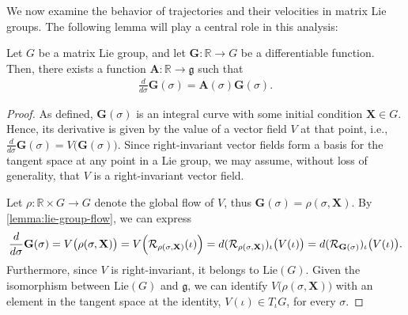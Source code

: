 We now examine the behavior of trajectories and their velocities in matrix Lie groups. The following lemma will play a central role in this analysis:
\begin{lemma} \label{lemma:derivative-lie-element-H-parallelizable} Let $G$ be a matrix Lie group, and let $\mathbf{G}:\mathbb{R}\to G$ be a differentiable function. Then, there exists a function $\mathbf{A}:\mathbb{R} \to \mathfrak{g}$ such that 
\begin{align}
    \frac{d}{d\sigma} \mathbf{G}(\sigma) = \mathbf{A}(\sigma) \mathbf{G}(\sigma). \label{eq:derivative-lie-element-H-parallelizable}
\end{align}
\end{lemma}
\begin{proof}
    As defined, $\mathbf{G}(\sigma)$ is an integral curve with some initial condition $\mathbf{X}\in G$. Hence, its derivative is given by the value of a vector field $V$ at that point, i.e., $\frac{d}{d\sigma}\mathbf{G}(\sigma) = V\bigl(\mathbf{G}(\sigma)\bigr)$. Since right-invariant vector fields form a basis for the tangent space at any point in a Lie group, we may assume, without loss of generality, that $V$ is a right-invariant vector field.

    Let $\rho: \mathbb{R} \times G \to G$ denote the global flow of $V$, thus $\mathbf{G}(\sigma) = \rho(\sigma, \mathbf{X})$. By \cref{lemma:lie-group-flow}, we can express
    \begin{align}
        \frac{d}{d\sigma} \mathbf{G}(\sigma) = V\bigl(\rho(\sigma, \mathbf{X})\bigr) = V\Bigl(\mathcal{R}_{\rho(\sigma, \mathbf{X})}(\iota)\Bigr) = d(\mathcal{R}_{\rho(\sigma, \mathbf{X})})_{\iota}\bigl(V(\iota)\bigr) = d(\mathcal{R}_{\mathbf{G}(\sigma)})_{\iota}\bigl(V(\iota)\bigr).
    \end{align}
    Furthermore, since $V$ is right-invariant, it belongs to $\text{Lie}(G)$. Given the isomorphism between $\text{Lie}(G)$ and $\mathfrak{g}$, we can identify $V\bigl(\rho(\sigma, \mathbf{X})\bigr)$ with an element in the tangent space at the identity, $V(\iota)\in T_\iota G$, for every $\sigma$. 
    

\end{proof}
